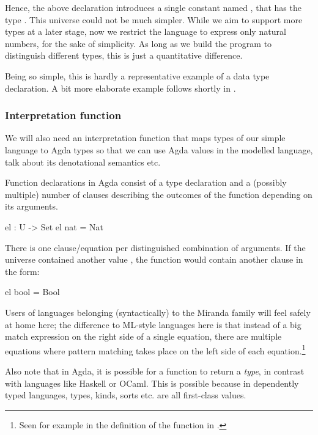 \noindent Hence, the above declaration introduces a single constant named ,
that has the type . This universe could not be much simpler. While we aim to support more
types at a later stage, now we restrict the language to express only natural
numbers, for the sake of simplicity. As long as we build the program to
distinguish different types, this is just a quantitative difference.

Being so simple, this is hardly a representative example of a data type
declaration. A bit more elaborate example follows shortly in .

\subsubsection{Interpretation function}

We will also need an interpretation function that maps
types of our simple language to Agda types so that we can use Agda values in
the modelled language, talk about its denotational semantics etc.

Function declarations in Agda consist of a type declaration and a (possibly multiple)
number of clauses describing the outcomes of the function depending on
its arguments.

\begin{code}
  el : U -> Set
  el nat = Nat
\end{code}

\noindent There is one clause/equation per distinguished combination of arguments. If the
universe  contained another value , the function 
would contain another clause in the form:
\begin{code}
  el bool = Bool
\end{code}
Users of languages belonging (syntactically) to the Miranda family will feel safely at
home here; the difference to ML-style languages here is that instead of a big match expression
on the right side of a single equation, there are multiple equations where pattern
matching takes place on the left side of each equation.\footnote{Seen for example in
the definition of the function  in .}

Also note that in Agda, it is possible for a function to return a \emph{type}, in contrast
with languages like Haskell or OCaml. This is possible because in dependently typed languages,
types, kinds, sorts etc. are all first-class values.

